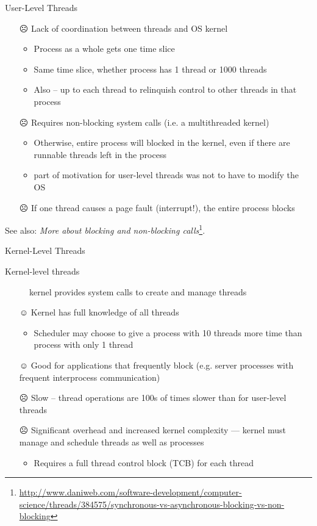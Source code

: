 \begin{frame}{User-Level Threads}
  \begin{itemize}
  \item[\alert{☹}]  Lack of coordination between threads and OS kernel
    \begin{itemize}
    \item Process as a whole gets one time slice
    \item Same time slice, whether process has 1 thread or 1000 threads
    \item Also -- up to each thread to relinquish control to other threads in that process
    \end{itemize}
  \item[\alert{☹}] Requires non-blocking system calls (i.e. a multithreaded kernel)
    \begin{itemize}
    \item Otherwise, entire process will blocked in the kernel, even if there are runnable threads
      left in the process
    \item part of motivation for user-level threads was not to have to modify the OS
    \end{itemize}
  \item[\alert{☹}] If one thread causes a page fault (interrupt!), the entire process
    blocks
  \end{itemize}
\end{frame}

See also: \emph{More about blocking and non-blocking calls}\footnote{\url{http://www.daniweb.com/software-development/computer-science/threads/384575/synchronous-vs-asynchronous-blocking-vs-non-blocking}}.

\begin{frame}{Kernel-Level Threads}
  \begin{description}
  \item[Kernel-level threads] kernel provides system calls to create and manage threads
  \end{description}
  \begin{itemize}
  \item[☺] Kernel has full knowledge of all threads
    \begin{itemize}
    \item Scheduler may choose to give a process with 10 threads more time than process with only 1
      thread
    \end{itemize}
  \item[☺] Good for applications that frequently block (e.g. server processes with
    frequent interprocess communication)
  \item[\alert{☹}] Slow -- thread operations are 100s of times slower than for
    user-level threads
  \item[\alert{☹}] Significant overhead and increased kernel complexity --- kernel must
    manage and schedule threads as well as processes
    \begin{itemize}
    \item Requires a full thread control block (TCB) for each thread
    \end{itemize}
  \end{itemize}
\end{frame}

